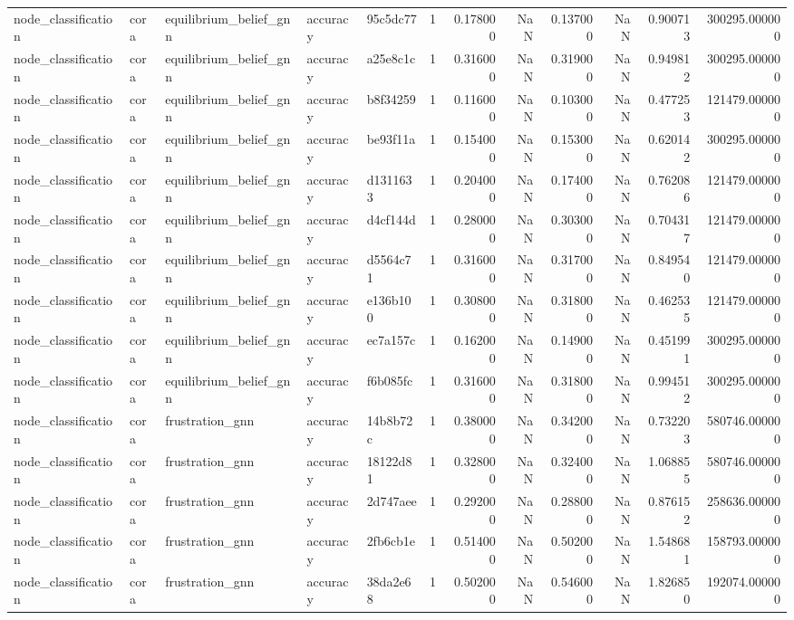 \begin{tabular}{lllllrrrrrrr}
node_classification & cora & equilibrium_belief_gnn & accuracy & 95c5dc77 & 1 & 0.178000 & NaN & 0.137000 & NaN & 0.900713 & 300295.000000 \\
node_classification & cora & equilibrium_belief_gnn & accuracy & a25e8c1c & 1 & 0.316000 & NaN & 0.319000 & NaN & 0.949812 & 300295.000000 \\
node_classification & cora & equilibrium_belief_gnn & accuracy & b8f34259 & 1 & 0.116000 & NaN & 0.103000 & NaN & 0.477253 & 121479.000000 \\
node_classification & cora & equilibrium_belief_gnn & accuracy & be93f11a & 1 & 0.154000 & NaN & 0.153000 & NaN & 0.620142 & 300295.000000 \\
node_classification & cora & equilibrium_belief_gnn & accuracy & d1311633 & 1 & 0.204000 & NaN & 0.174000 & NaN & 0.762086 & 121479.000000 \\
node_classification & cora & equilibrium_belief_gnn & accuracy & d4cf144d & 1 & 0.280000 & NaN & 0.303000 & NaN & 0.704317 & 121479.000000 \\
node_classification & cora & equilibrium_belief_gnn & accuracy & d5564c71 & 1 & 0.316000 & NaN & 0.317000 & NaN & 0.849540 & 121479.000000 \\
node_classification & cora & equilibrium_belief_gnn & accuracy & e136b100 & 1 & 0.308000 & NaN & 0.318000 & NaN & 0.462535 & 121479.000000 \\
node_classification & cora & equilibrium_belief_gnn & accuracy & ec7a157c & 1 & 0.162000 & NaN & 0.149000 & NaN & 0.451991 & 300295.000000 \\
node_classification & cora & equilibrium_belief_gnn & accuracy & f6b085fc & 1 & 0.316000 & NaN & 0.318000 & NaN & 0.994512 & 300295.000000 \\
node_classification & cora & frustration_gnn & accuracy & 14b8b72c & 1 & 0.380000 & NaN & 0.342000 & NaN & 0.732203 & 580746.000000 \\
node_classification & cora & frustration_gnn & accuracy & 18122d81 & 1 & 0.328000 & NaN & 0.324000 & NaN & 1.068855 & 580746.000000 \\
node_classification & cora & frustration_gnn & accuracy & 2d747aee & 1 & 0.292000 & NaN & 0.288000 & NaN & 0.876152 & 258636.000000 \\
node_classification & cora & frustration_gnn & accuracy & 2fb6cb1e & 1 & 0.514000 & NaN & 0.502000 & NaN & 1.548681 & 158793.000000 \\
node_classification & cora & frustration_gnn & accuracy & 38da2e68 & 1 & 0.502000 & NaN & 0.546000 & NaN & 1.826850 & 192074.000000 \\

\end{tabular}
